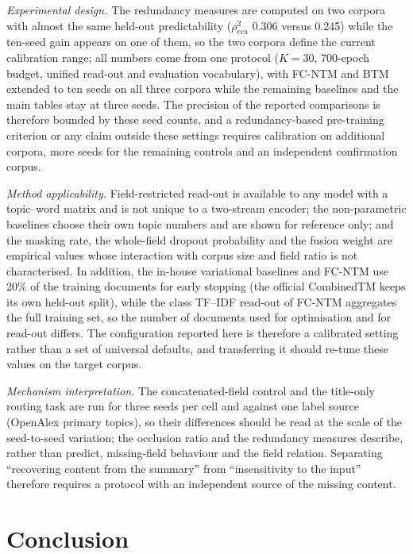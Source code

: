 \documentclass{article}
\begin{document}
\emph{Experimental design.} The redundancy measures are computed on two corpora with almost the
same held-out predictability ($\rho^2_{\mathrm{cca}}$ 0.306 versus 0.245) while the ten-seed gain
appears on one of them, so the two corpora define the current calibration range; all numbers come
from one protocol ($K=30$, 700-epoch budget, unified read-out and evaluation vocabulary), with
FC-NTM and BTM extended to ten seeds on all three corpora while the remaining baselines and the
main tables stay at three seeds. The precision of the reported comparisons is therefore bounded by
these seed counts, and a redundancy-based pre-training criterion or any claim outside these settings
requires calibration on additional corpora, more seeds for the remaining controls and an independent
confirmation corpus.

\emph{Method applicability.} Field-restricted read-out is available to any model with a
topic--word matrix and is not unique to a two-stream encoder; the non-parametric baselines choose
their own topic numbers and are shown for reference only; and the masking rate, the whole-field dropout
probability and the fusion weight are empirical values whose interaction with corpus size and field
ratio is not characterised. In addition, the in-house variational baselines and FC-NTM use 20\% of the
training documents for early stopping (the official CombinedTM keeps its own held-out split), while
the class TF--IDF read-out of FC-NTM aggregates the full training set, so the number of documents
used for optimisation and for read-out differs. The configuration reported here is therefore a
calibrated setting rather than a set of universal defaults, and transferring it should re-tune these
values on the target corpus.

\emph{Mechanism interpretation.} The concatenated-field control and the title-only routing task
are run for three seeds per cell and against one label source (OpenAlex primary topics), so their
differences should be read at the scale of the seed-to-seed variation; the occlusion ratio and the
redundancy measures describe, rather than predict, missing-field behaviour and the field relation.
Separating ``recovering content from the summary'' from ``insensitivity to the input'' therefore
requires a protocol with an independent source of the missing content.

\section{Conclusion}
\end{document}
